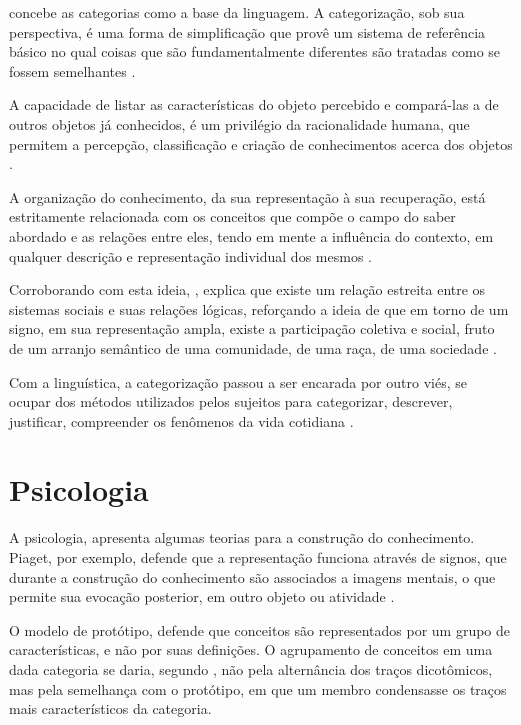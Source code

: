  concebe as categorias como a base da linguagem. A categorização, sob sua perspectiva, é uma forma de simplificação que provê um sistema de referência básico no qual coisas que são fundamentalmente diferentes são tratadas como se fossem semelhantes \cite{artencio:2012.sobre}.

A capacidade de listar as características do objeto percebido e compará-las a de outros objetos já conhecidos, é um privilégio da racionalidade humana, que permitem a percepção, classificação e criação de conhecimentos acerca dos objetos \cite{alvarenga:2003.representacao}.

A organização do conhecimento, da sua representação à sua recuperação, está estritamente relacionada com os conceitos que compõe o campo do saber abordado e as relações entre eles, tendo em mente a influência do contexto, em qualquer descrição e representação individual dos mesmos \cite{lima:2003.interfaces}. 

Corroborando com esta ideia, , explica que existe um relação estreita entre os sistemas sociais e suas relações lógicas, reforçando a ideia de que em torno de um signo, em sua representação ampla, existe a participação coletiva e social, fruto de um arranjo semântico de uma comunidade, de uma raça, de uma sociedade \cite{artencio:2012.sobre}. 

Com a linguística, a categorização passou a ser encarada por outro viés, se ocupar dos métodos utilizados pelos sujeitos para categorizar, descrever, justificar, compreender os fenômenos da vida cotidiana .

\section{\hspace*{3pt} Psicologia}

A psicologia, apresenta algumas teorias para a construção do conhecimento. 
Piaget, por exemplo, defende que a representação funciona através de signos, que durante a construção do conhecimento são associados a imagens mentais, o que permite sua evocação posterior, em outro objeto ou atividade \cite{smolka:1993.construcao}.

O modelo de protótipo, defende que conceitos são representados por um grupo de características, e não por suas definições. O agrupamento de conceitos em uma dada categoria se daria, segundo , não pela alternância dos traços dicotômicos, mas pela semelhança com o protótipo, em que um membro condensasse os traços mais característicos da categoria.

